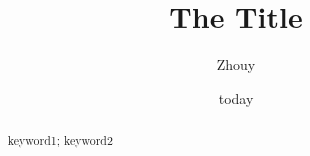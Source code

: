 \documentclass{mcmthesis}
\title{The Title}
\author{Zhouy}
\date{today}
\begin{document}
\begin{abstract}
\blindtext                  %
\begin{keywords}
keyword1; keyword2
\end{keywords}
\end{abstract}

\maketitle                  %

\blindtext                  %
\end{document}
